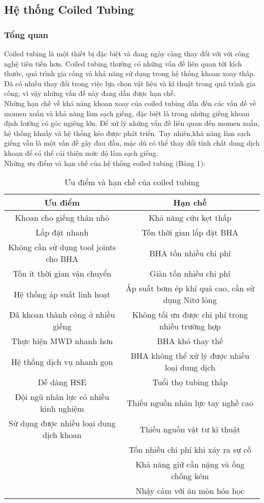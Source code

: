 \documentclass[12pt,a4paper]{article}
\begin{document}
\subsection{Hệ thống Coiled Tubing}
\subsubsection{Tổng quan}
	Coiled tubing\cite{rehm2013underbalanced} là một thiết bị đặc biệt và đang ngày càng thay đổi với với công nghệ tiên tiến hơn. Coiled tubing thường có những vấn đề liên quan tới kích thước, quá trình gia công và khả năng sử dụng trong hệ thống khoan xoay thấp. Đã có nhiều thay đổi trong việc lựa chọn vật liệu và kĩ thuật trong quá trình gia công, vì vậy những vấn đề này đang dần được hạn chế. \\
	Những hạn chế về khả năng khoan xoay của coiled tubing dẫn đến các vấn đề về momen xoắn và khả năng làm sạch giếng, đặc biệt là trong những giếng khoan định hướng có góc ngiêng lớn. Để xử lý những vấn đề liên quan đến momen xoắn, hệ thống khuấy và hệ thống kéo được phát triển. Tuy nhiên,khả năng làm sạch giếng vẫn là một vấn đề gây đau đầu, mặc dù có thể thay đổi tính chất dung dịch khoan để có thể cải thiện mức độ làm sạch giếng.\\
	Những ưu điểm và hạn chế của hệ thống coiled tubing (Bảng 1):
	\begin{table}[h]
	\centering
	\caption{Ưu điểm và hạn chế của coiled tubing\cite{rehm2013underbalanced}}
	\label{Table}
	\begin{tabular}{|c|c|}
	\hline
	\rowcolor[HTML]{C0C0C0} 
	 \textbf{Ưu điểm} & \textbf{Hạn chế} \\ \hline
	 Khoan cho giếng thân nhỏ  &Khả năng cứu kẹt thấp   \\ \hline
	 Lắp đặt nhanh & Tốn thời gian lắp đặt BHA  \\ \hline
	 Không cần sử dụng tool joints cho BHA & BHA tốn nhiều chi phí  \\ \hline
	 Tốn ít thời gian vận chuyển & Giàn tốn nhiều chi phí  \\ \hline
	 Hệ thống áp suất linh hoạt & Áp suất bơm ép khí quá cao, cần sử dụng Nitơ lỏng \\ \hline
	 Đã khoan thành công ở nhiều giếng & Không tối ưu được chi phí trong nhiều trường hợp  \\ \hline
	 Thực hiện MWD nhanh hơn & BHA khó thay thế  \\ \hline
	 Hệ thống dịch vụ nhanh gọn & BHA không thể xử lý được nhiều loại dung dịch  \\ \hline
	 Dễ dàng HSE & Tuổi thọ tubing thấp  \\ \hline
	 Đội ngũ nhân lực có nhiều kinh nghiệm &  Thiếu nguồn nhân lực tay nghề cao  \\ \hline
	 Sử dụng được nhiều loại dung dịch khoan & Thiếu nguồn vật tư kĩ thuật  \\ \hline
	  & Tốn nhiều chi phí khi xảy ra sự cố  \\ \hline
	  & Khả năng giữ cần nặng và ống chống kém  \\ \hline
	  & Nhậy cảm với ăn mòn hóa học  \\ \hline
	\end{tabular}
	\end{table}
\end{document}
